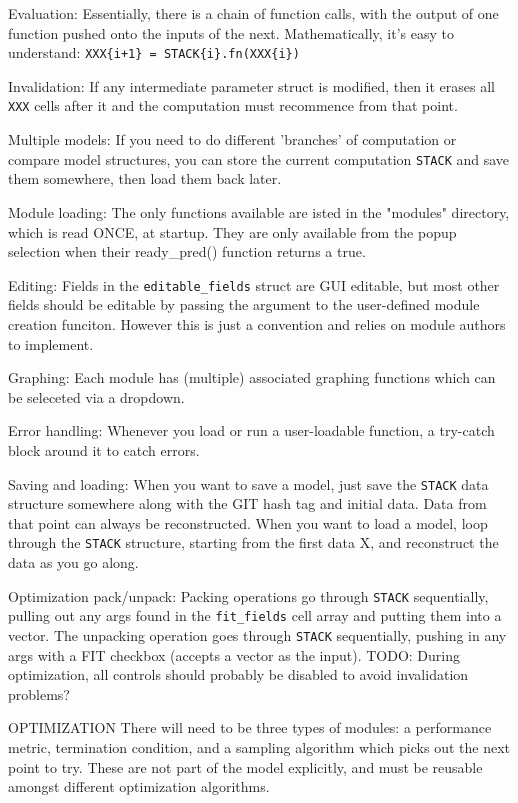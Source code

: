 \documentclass{article}
\newcommand{\matlab}[1]{\texttt{#1}}
\begin{document}
\begin{description}
\item {Evaluation: } Essentially, there is a chain of function calls, with the output of one function pushed onto the inputs of the next. Mathematically, it's easy to understand: \matlab{XXX\{i+1\} = STACK\{i\}.fn(XXX\{i\})}
\item {Invalidation: } If any intermediate parameter struct is modified, then it erases all \matlab{XXX} cells after it and the computation must recommence from that point. 
\item {Multiple models: } If you need to do different 'branches' of computation or compare model structures, you can store the current computation \matlab{STACK} and save them somewhere, then load them back later.
\item {Module loading: } The only functions available are isted in the "modules" directory, which is read ONCE, at startup. They are only available from the popup selection when their ready\_pred() function returns a true. 
\item {Editing: } Fields in the \matlab{editable\_fields} struct are GUI editable, but most other fields should be editable by passing the argument to the user-defined module creation funciton. However this is just a convention and relies on module authors to implement.
\item {Graphing: } Each module has (multiple) associated graphing functions which can be seleceted via a dropdown.
\item {Error handling: } Whenever you load or run a user-loadable function, a try-catch block around it to catch errors.
\item {Saving and loading: } When you want to save a model, just save the \matlab{STACK} data structure somewhere along with the GIT hash tag and initial data. Data from that point can always be reconstructed. When you want to load a model, loop through the \matlab{STACK} structure, starting from the first data X, and reconstruct the data as you go along.
\item {Optimization pack/unpack: } Packing operations go through \matlab{STACK} sequentially, pulling out any args found in the \matlab{fit\_fields} cell array and putting them into a vector. The unpacking operation goes through \matlab{STACK} sequentially, pushing in any args with a FIT checkbox (accepts a vector as the input). TODO: During optimization, all controls should probably be disabled to avoid invalidation problems?
\item {OPTIMIZATION} There will need to be three types of modules: a performance metric, termination condition, and a sampling algorithm which picks out the next point to try. These are not part of the model explicitly, and must be reusable amongst different optimization algorithms. 
\end{description}
\end{document}
